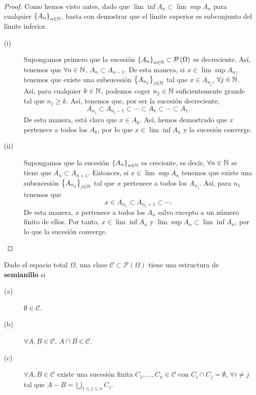\begin{proof} 
	Como hemos visto antes, dado que $\displaystyle \lim \inf A_{n} \subset \lim \sup A_{n} $ para cualquier $\displaystyle \left\{ A_{n}\right\} _{n\in\mathbb{N}} $, basta con demostrar que el límite superior es subconjunto del límite inferior.
\begin{description}
	\item[(i)] Supongamos primero que la sucesión $\displaystyle \left\{ A_{n}\right\} _{n\in\mathbb{N}} \subset \mathcal{P}\left(\Omega \right) $ es decreciente. Así, tenemos que $\displaystyle \forall n \in \mathbb{N} $, $\displaystyle A_{n} \subset A_{n-1} $. 
		De esta manera, si $\displaystyle x \in \lim \sup A_{n} $, tenemos que existe una subsucesión $\displaystyle \left\{ A_{n_{j}}\right\} _{j\in\mathbb{N}} $ tal que $\displaystyle x \in A_{n_{j}} $, $\displaystyle \forall j \in \mathbb{N} $. Así, para cualquier $\displaystyle k \in \mathbb{N} $, podemos coger $\displaystyle n_{j} \in \mathbb{N} $ suficientemente grande tal que $\displaystyle n_{j} \geq k $. Así, tenemos que, por ser la sucesión decreciente, 
		\[A_{n_{j}} \subset A_{n_{j}-1} \subset \cdots \subset A_{k} \subset \cdots \subset A_{1} .\]
	De esta manera, está claro que $\displaystyle x \in A_{k} $. Así, hemos demostrado que $\displaystyle x $ pertenece a todos los $\displaystyle A_{k} $, por lo que $\displaystyle x \in \lim \inf A_{n} $ y la sucesión converge.
\item[(ii)] Supongamos que la sucesión $\displaystyle \left\{ A_{n}\right\} _{n\in\mathbb{N}} $ es creciente, es decir, $\displaystyle \forall n \in \mathbb{N} $ se tiene que $\displaystyle A_{n} \subset A_{n+1} $. Entonces, si $\displaystyle x \in \lim \sup A_{n} $ tenemos que existe una subsucesión $\displaystyle \left\{ A_{n_{j}}\right\} _{j\in\mathbb{N}} $ tal que $\displaystyle x $ pertenece a todos los $\displaystyle A_{n_{j}} $.
	Así, para $\displaystyle n_{1} $ tenemos que 
	\[x \in A_{n_{1}} \subset A_{n_{1}+1} \subset \cdots .\]
	De esta manera, $\displaystyle x $ pertenece a todos los $\displaystyle A_{n} $ salvo excepto a un número finito de ellos. Por tanto, $\displaystyle x \in \lim \inf A_{n} $ y $\displaystyle \lim \sup A_{n} \subset \lim \inf A_{n} $, por lo que la sucesión converge.
\end{description}
\end{proof}
\begin{definition}[Semianillo]
Dado el espacio total $\displaystyle \Omega  $, una clase $\displaystyle \mathcal{C} \subset \mathcal{P}\left(\Omega \right) $ tiene una estructura de \textbf{semianillo} si 
\begin{description}
\item[(a)] $\displaystyle \emptyset \in \mathcal{C} $.
\item[(b)] $\displaystyle \forall A,B \in \mathcal{C} $, $\displaystyle A \cap B \in \mathcal{C} $.
\item[(c)] $\displaystyle \forall A, B \in \mathcal{C} $ existe una sucesión finita $\displaystyle C_{1}, \ldots, C_{n} \in \mathcal{C} $ con $\displaystyle C_{i} \cap C_{j} = \emptyset $, $\displaystyle \forall i \neq j $ tal que $\displaystyle A - B = \bigcup_{1 \leq j \leq n}C_{j} $.
\end{description}
\end{definition}
